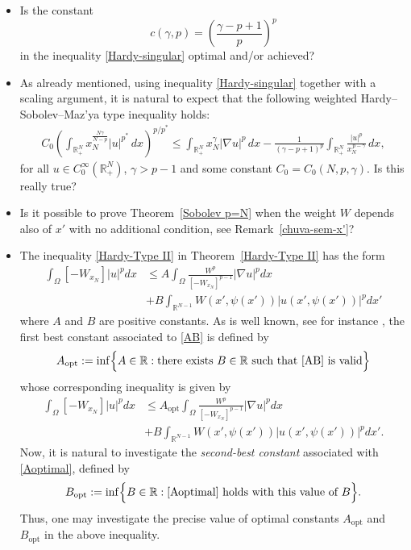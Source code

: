 \documentclass[12pt]{amsart}
\theoremstyle{definition}
\theoremstyle{plain}
\begin{document}
\begin{itemize}
\item Is the constant $$c(\gamma,p)=\left(\frac{\gamma -p+1}{p}\right)^{p}$$ in the inequality \eqref{Hardy-singular} optimal and/or achieved? \\

\item As already mentioned, using inequality \eqref{Hardy-singular} together with a scaling argument, 
it is natural to expect that the following weighted Hardy--Sobolev--Maz'ya type inequality holds:
\begin{align*}
C_0
\left(
    \int_{\mathbb{R}^N_+} x_N^{\frac{N\gamma}{N-p}} |u|^{p^*} \, dx
\right)^{\!p/p^*}
 \leq
\int_{\mathbb{R}^N_+} x_N^{\gamma} |\nabla u|^p \, dx -
\frac{1}{(\gamma - p + 1)^{p}}
\int_{\mathbb{R}^N_+} \frac{|u|^p}{x_N^{\,p-\gamma}} \, dx,
\end{align*}
for all $u \in C_0^\infty(\mathbb{R}^N_+)$, $\gamma > p-1$ and some constant $C_0 = C_0(N,p,\gamma)$. Is this really true?\\

\item Is it possible to prove Theorem~\ref{Sobolev p=N} when the weight $W$ depends also of $x'$ with no additional condition, see Remark~\ref{chuva-sem-x'}?\\

\item The inequality \eqref{Hardy-Type II} in Theorem~\ref{Hardy-Type II} has  the form 
\begin{equation} \label{AB}
    \begin{aligned}
        \int_{\Omega} [-W_{x_N}]|u|^pdx & \leq   A \int_{\Omega} \frac{W^p}
         {\left[-W_{x_N}\right]^{p-1}}|\nabla u|^pdx \\ & +   B	\int_{\mathbb{R}^{N-1}} W(x',\psi(x'))|u(x',\psi(x'))|^pdx'
    \end{aligned}    
\end{equation}
 where $A$ and $B$ are positive constants.  As is well known, see for instance \cite{Druet-Hebey},  the first best constant associated to \eqref{AB} is defined by
  $$
  A_{\mathrm{opt}}:=\inf \Bigl\{A\in \mathbb{R}: \mbox{there exists }  B\in\mathbb{R}  \mbox{ such that } \eqref{AB}\mbox{ is valid} \Bigr\}
  $$
whose corresponding inequality is given by 
\begin{equation}\label{Aoptimal}
        \begin{aligned} \int_{\Omega} [-W_{x_N}]|u|^pdx & \leq A_{\mathrm{opt}}\int_{\Omega} \frac{W^p}
         {\left[-W_{x_N}\right]^{p-1}}|\nabla u|^pdx \\ & +  B	\int_{\mathbb{R}^{N-1}} 
         W(x',\psi(x'))|u(x',\psi(x'))|^pdx'.
         \end{aligned}
  \end{equation}
Now, it is natural to investigate the \emph{second-best constant} associated with \eqref{Aoptimal}, defined by 
\[
B_{\mathrm{opt}}
   := \inf\Bigl\{ B \in \mathbb{R} : \eqref{Aoptimal} \text{ holds with this value of } B \Bigr\}.
\]
Thus, one may investigate the precise value of optimal constants $A_{\mathrm{opt}}$ and $B_{\mathrm{opt}}$ in the above inequality.\\


\end{itemize}
\end{document}
